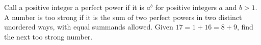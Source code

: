 Call a positive integer a perfect power if it is $a^b$ for positive integers $a$ and $b>1$. A number is too strong if it is the sum of two perfect powers in two distinct unordered ways, with equal summands allowed. Given $17=1+16=8+9$, find the next too strong number.
